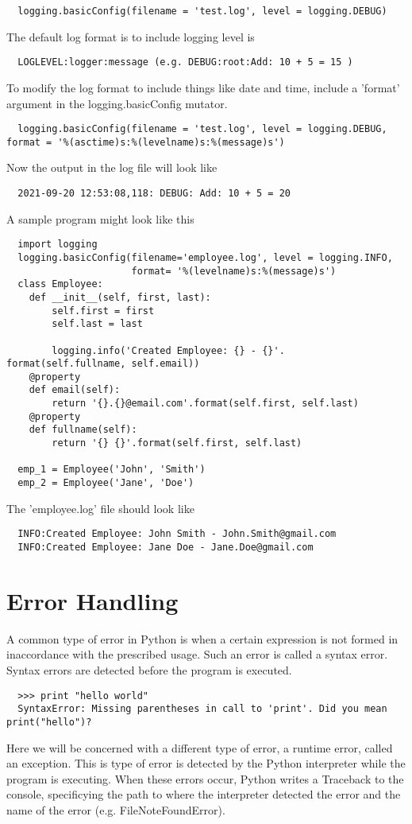 \documentclass{article}%
\begin{document}
\begin{lstlisting}
  logging.basicConfig(filename = 'test.log', level = logging.DEBUG)
\end{lstlisting}
The default log format is to include logging level is 
\begin{lstlisting}
  LOGLEVEL:logger:message (e.g. DEBUG:root:Add: 10 + 5 = 15 )
\end{lstlisting}
To modify the log format to include things like date and time, include a 'format' argument in the logging.basicConfig mutator. 
\begin{lstlisting}
  logging.basicConfig(filename = 'test.log', level = logging.DEBUG, format = '%(asctime)s:%(levelname)s:%(message)s')
\end{lstlisting}
Now the output in the log file will look like
\begin{lstlisting}
  2021-09-20 12:53:08,118: DEBUG: Add: 10 + 5 = 20
\end{lstlisting}
A sample program might look like this
\begin{lstlisting}
  import logging
  logging.basicConfig(filename='employee.log', level = logging.INFO,
                      format= '%(levelname)s:%(message)s')
  class Employee:
    def __init__(self, first, last):
        self.first = first
        self.last = last

        logging.info('Created Employee: {} - {}'. format(self.fullname, self.email))
    @property
    def email(self):
        return '{}.{}@email.com'.format(self.first, self.last)
    @property
    def fullname(self):
        return '{} {}'.format(self.first, self.last)
  
  emp_1 = Employee('John', 'Smith')
  emp_2 = Employee('Jane', 'Doe')
\end{lstlisting}
The 'employee.log' file should look like
\begin{lstlisting}
  INFO:Created Employee: John Smith - John.Smith@gmail.com
  INFO:Created Employee: Jane Doe - Jane.Doe@gmail.com
\end{lstlisting}

\section{Error Handling}
A common type of error in Python is when a certain expression is not formed in inaccordance with the prescribed usage. Such an error is called a syntax error. Syntax errors are detected before the program is executed. 
\begin{lstlisting}
  >>> print "hello world"
  SyntaxError: Missing parentheses in call to 'print'. Did you mean print("hello")?
\end{lstlisting}
Here we will be concerned with a different type of error, a runtime error, called an exception. This is type of error is detected by the Python interpreter while the program is executing. When these errors occur, Python writes a Traceback to the console, specificying the path to where the interpreter detected the error and the name of the error (e.g. FileNoteFoundError). \\ 
\end{document}

